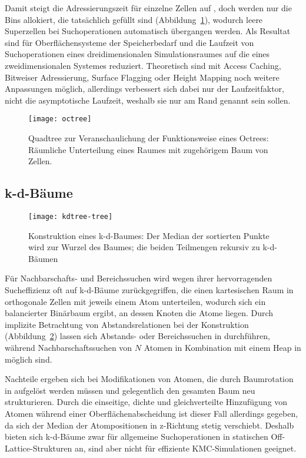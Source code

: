 Damit steigt die Adressierungszeit für einzelne Zellen auf , doch werden nur die Bins allokiert, die tatsächlich gefüllt sind (Abbildung~\ref{fig:octree}), wodurch leere Superzellen bei Suchoperationen automatisch übergangen werden.
Als Resultat sind für Oberflächensysteme der Speicherbedarf und die Laufzeit von Suchoperationen eines dreidimensionalen Simulationsraumes auf die eines zweidimensionalen Systemes reduziert.
Theoretisch sind mit Access Caching, Bitweiser Adressierung, Surface Flagging oder Height Mapping noch weitere Anpassungen möglich, allerdings verbessert sich dabei nur der Laufzeitfaktor, nicht die asymptotische Laufzeit, weshalb sie nur am Rand genannt sein sollen.

\begin{figure}[t]
  \centering
  \texttt{[image: octree]}
  \caption[Veranschaulichung der Funktionsweise eines Octrees]{
    Quadtree zur Veranschaulichung der Funktionsweise eines Octrees:\\
    Räumliche Unterteilung eines Raumes mit zugehörigem Baum von Zellen.
  }
  \label{fig:octree}
\end{figure}

\subsection{k-d-Bäume}
\label{datakdtree}

\begin{figure}[b]
  \texttt{[image: kdtree-tree]}
  \caption[Konstruktion eines k-d-Baumes]{
    Konstruktion eines k-d-Baumes:
    Der Median der sortierten Punkte wird zur Wurzel des Baumes; die beiden Teilmengen rekursiv zu k-d-Bäumen
  }
  \label{fig:kdtree}
\end{figure}

Für Nachbarschafts- und Bereichssuchen wird wegen ihrer hervorragenden Sucheffizienz oft auf k-d-Bäume zurückgegriffen, die einen kartesischen Raum in orthogonale Zellen mit jeweils einem Atom unterteilen, wodurch sich ein balancierter Binärbaum ergibt, an dessen Knoten die Atome liegen.
Durch implizite Betrachtung von Abstandsrelationen bei der Konstruktion (Abbildung~\ref{fig:kdtree}) lassen sich Abstands- oder Bereichssuchen in  durchführen, während Nachbarschaftssuchen von $N$ Atomen in Kombination mit einem Heap in  möglich sind.

Nachteile ergeben sich bei Modifikationen von Atomen, die durch Baumrotation in  aufgelöst werden müssen und gelegentlich den gesamten Baum neu strukturieren.
Durch die einseitige, dichte und gleichverteilte Hinzufügung von Atomen während einer Oberflächenabscheidung ist dieser Fall allerdings gegeben, da sich der Median der Atompositionen in z-Richtung stetig verschiebt.
Deshalb bieten sich k-d-Bäume zwar für allgemeine Suchoperationen in statischen Off-Lattice-Strukturen an, sind aber nicht für effiziente KMC-Simulationen geeignet.

